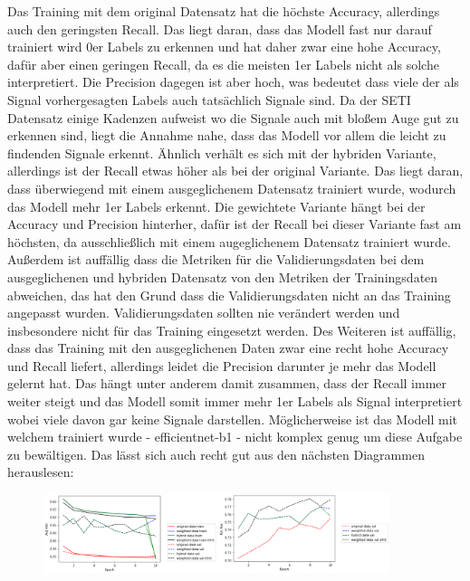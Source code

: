 \documentclass[12pt, a4paper]{article}
\begin{document}
Das Training mit dem original Datensatz hat die höchste Accuracy, allerdings auch den geringsten Recall. Das liegt daran, dass das Modell fast nur darauf trainiert wird 0er Labels zu erkennen und hat daher zwar eine hohe Accuracy, dafür aber einen geringen Recall, da es die meisten 1er Labels nicht als solche interpretiert. Die Precision dagegen ist aber hoch, was bedeutet dass viele der als Signal vorhergesagten Labels auch tatsächlich Signale sind. Da der SETI Datensatz einige Kadenzen aufweist wo die Signale auch mit bloßem Auge gut zu erkennen sind, liegt die Annahme nahe, dass das Modell vor allem die leicht zu findenden Signale erkennt. Ähnlich verhält es sich mit der hybriden Variante, allerdings ist der Recall etwas höher als bei der original Variante. Das liegt daran, dass überwiegend mit einem ausgeglichenem Datensatz trainiert wurde, wodurch das Modell mehr 1er Labels erkennt. Die gewichtete Variante hängt bei der Accuracy und Precision hinterher, dafür ist der Recall bei dieser Variante fast am höchsten, da ausschließlich mit einem augeglichenem Datensatz trainiert wurde. Außerdem ist auffällig dass die Metriken für die Validierungsdaten bei dem ausgeglichenen und hybriden Datensatz von den Metriken der Trainingsdaten abweichen, das hat den Grund dass die Validierungsdaten nicht an das Training angepasst wurden. Validierungsdaten sollten nie verändert werden und insbesondere nicht für das Training eingesetzt werden. Des Weiteren ist auffällig, dass das Training mit den ausgeglichenen Daten zwar eine recht hohe Accuracy und Recall liefert, allerdings leidet die Precision darunter je mehr das Modell gelernt hat. Das hängt unter anderem damit zusammen, dass der Recall immer weiter steigt und das Modell somit immer mehr 1er Labels als Signal interpretiert wobei viele davon gar keine Signale darstellen. Möglicherweise ist das Modell mit welchem trainiert wurde - efficientnet-b1 - nicht komplex genug um diese Aufgabe zu bewältigen. Das lässt sich auch recht gut aus den nächsten Diagrammen herauslesen:
\begin{figure}[h]
\centering
\includegraphics[width=0.9\textwidth]{metrics-avgloss-rocauc.png}
\end{figure}
\end{document}

